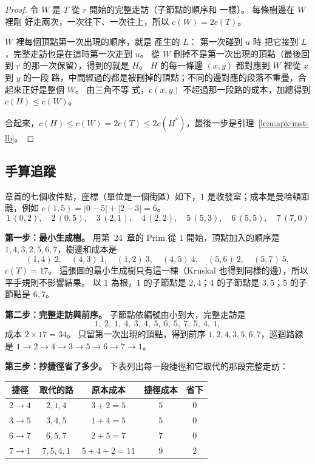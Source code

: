 \begin{proof}
令 $W$ 是 $T$ 從 $r$ 開始的完整走訪（子節點的順序和  一樣）。 每條樹邊在 $W$ 裡剛
好走兩次，一次往下、一次往上，所以 $c(W) = 2c(T)$。

$W$ 裡每個頂點第一次出現的順序，就是  產生的 $L$： 第一次碰到 $u$ 時
把它接到 $L$，完整走訪也是在這時第一次走到 $u$。 從 $W$ 刪掉不是第一次出現的頂點（最後回到 $r$
的那一次保留），得到的就是 $H$。 $H$ 的每一條邊 $(x, y)$ 都對應到 $W$ 裡從 $x$ 到 $y$ 的一段
路，中間經過的都是被刪掉的頂點；不同的邊對應的段落不重疊，合起來正好是整個 $W$。 由三角不等
式，$c(x, y)$ 不超過那一段路的成本，加總得到 $c(H) \le c(W)$。

合起來，$c(H) \le c(W) = 2c(T) \le 2c(H^*)$，最後一步是引理~\ref{lem:apx-mst-lb}。
\end{proof}

\subsection{手算追蹤}

章首的七個收件點，座標（單位是一個街區）如下，$1$ 是收發室；成本是曼哈頓距離，例如
$c(1, 5) = |0 - 5| + |2 - 3| = 6$。
\[
1\,(0, 2),\quad 2\,(0, 5),\quad 3\,(2, 1),\quad 4\,(2, 2),\quad 5\,(5, 3),\quad 6\,(5, 5),\quad 7\,(7, 0)
\]

\textbf{第一步：最小生成樹。} 用第~24~章的 Prim 從 $1$ 開始，頂點加入的順序是
$1, 4, 3, 2, 5, 6, 7$，樹邊和成本是
\[
(1,4)\ 2,\quad (4,3)\ 1,\quad (1,2)\ 3,\quad (4,5)\ 4,\quad (5,6)\ 2,\quad (5,7)\ 5,
\]
$c(T) = 17$。 這張圖的最小生成樹只有這一棵（Kruskal 也得到同樣的邊），所以平手規則不影響結果。
以 $1$ 為根，$1$ 的子節點是 $2, 4$；$4$ 的子節點是 $3, 5$；$5$ 的子節點是 $6, 7$。

\textbf{第二步：完整走訪與前序。} 子節點依編號由小到大，完整走訪是
\[
1,\ 2,\ 1,\ 4,\ 3,\ 4,\ 5,\ 6,\ 5,\ 7,\ 5,\ 4,\ 1,
\]
成本 $2 \times 17 = 34$。 只留第一次出現的頂點，得到前序 $1, 2, 4, 3, 5, 6, 7$，巡迴路線是
$1 \to 2 \to 4 \to 3 \to 5 \to 6 \to 7 \to 1$。

\textbf{第三步：抄捷徑省了多少。} 下表列出每一段捷徑和它取代的那段完整走訪：

\begin{center}
\begin{tabular}{ccccc}
\toprule
捷徑 & 取代的路 & 原本成本 & 捷徑成本 & 省下 \\
\midrule
$2 \to 4$ & $2, 1, 4$ & $3 + 2 = 5$ & $5$ & $0$ \\
$3 \to 5$ & $3, 4, 5$ & $1 + 4 = 5$ & $5$ & $0$ \\
$6 \to 7$ & $6, 5, 7$ & $2 + 5 = 7$ & $7$ & $0$ \\
$7 \to 1$ & $7, 5, 4, 1$ & $5 + 4 + 2 = 11$ & $9$ & $2$ \\
\bottomrule
\end{tabular}
\end{center}

